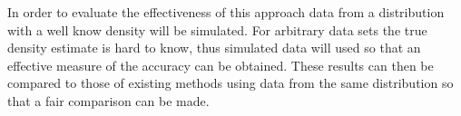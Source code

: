 \documentclass[a4paper, 10pt]{report} %
\begin{document}
In order to evaluate the effectiveness of this approach data from a distribution with a well know density will be simulated. For arbitrary data sets the true density estimate is hard to know, thus simulated data will used so that an effective measure of the accuracy can be obtained. These results can then be compared to those of existing methods using data from the same distribution so that a fair comparison can be made.












\end{document}

